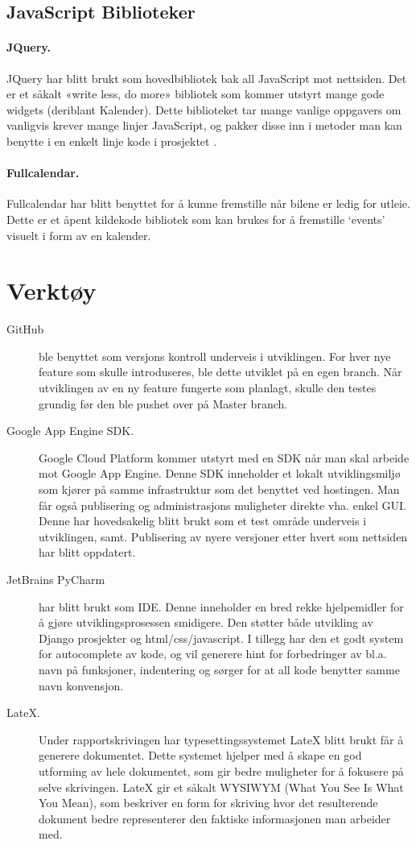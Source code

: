 \subsection{JavaScript Biblioteker}
\paragraph*{JQuery.}
JQuery har blitt brukt som hovedbibliotek bak all JavaScript mot nettsiden. Det er et såkalt «write less, do more» bibliotek som kommer utstyrt mange gode widgets (deriblant Kalender). Dette biblioteket tar mange vanlige oppgavers om vanligvis krever mange linjer JavaScript, og pakker disse inn i metoder man kan benytte i en enkelt linje kode i prosjektet \cite{ jquery:what}. 
\paragraph*{Fullcalendar.}
Fullcalendar har blitt benyttet for å kunne fremstille når bilene er ledig for utleie. Dette er et åpent kildekode bibliotek som kan brukes for å fremstille ‘events’ visuelt i form av en kalender.


\newpage
\section{Verktøy}
\begin{description}
\item[GitHub]ble benyttet som versjons kontroll underveis i utviklingen. For hver nye feature som skulle introduseres, ble dette utviklet på en egen branch. Når utviklingen av en ny feature fungerte som planlagt, skulle den testes grundig før den ble pushet over på Master branch.
\item[Google App Engine SDK.] Google Cloud Platform kommer utstyrt med en SDK når man skal arbeide mot Google App Engine. Denne SDK inneholder et lokalt utviklingsmiljø som kjører på samme infrastruktur som det benyttet ved hostingen. Man får også publisering og administrasjons muligheter direkte vha. enkel GUI. Denne har hovedsakelig blitt brukt som et test område underveis i utviklingen, samt. Publisering av nyere versjoner etter hvert som nettsiden har blitt oppdatert.
\item[JetBrains PyCharm] har blitt brukt som IDE. Denne inneholder en bred rekke hjelpemidler for å gjøre utviklingsprosessen smidigere. Den støtter både utvikling av Django prosjekter og html/css/javascript. I tillegg har den et godt system for autocomplete av kode, og vil generere hint for forbedringer av bl.a. navn på funksjoner, indentering og sørger for at all kode benytter samme navn konvensjon.
\item[LateX.]Under rapportskrivingen har typesettingssystemet LateX blitt brukt får å generere dokumentet. Dette systemet hjelper med å skape en god utforming av hele dokumentet, som gir bedre muligheter for å fokusere på selve skrivingen. LateX gir et såkalt WYSIWYM (What You See Is What You Mean), som beskriver en form for skriving hvor det resulterende dokument bedre representerer den faktiske informasjonen man arbeider med.



\end{description}

